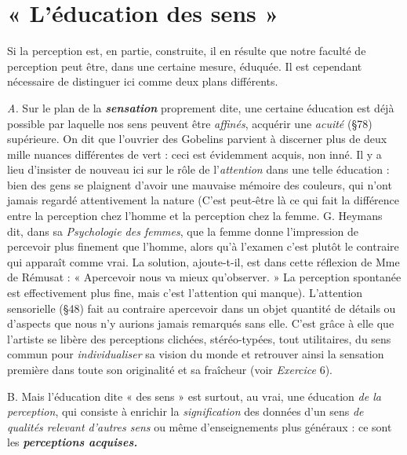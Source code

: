 \section{« L'éducation des sens »}%
Si la perception est, en partie,
construite, il en résulte que notre faculté de perception peut être,
dans une certaine mesure, éduquée. Il est cependant nécessaire de
distinguer ici comme deux plans différents.

{\it A.} Sur le plan de la \textbf{\textit {sensation}} proprement dite, une certaine éducation
est déjà possible par laquelle nos sens peuvent être {\it affinés},
acquérir une {\it acuité} (\S 78) supérieure. On dit que l’ouvrier des Gobelins
parvient à discerner plus de deux mille nuances différentes de vert :
ceci est évidemment acquis, non inné. Il y a lieu d’insister de nouveau
ici sur le rôle de l’{\it attention} dans une telle éducation : bien des gens se
plaignent d’avoir une mauvaise mémoire des couleurs, qui n’ont
jamais regardé attentivement la nature
{\scriptsize (C'est peut-être là ce qui fait la différence entre la perception chez l’homme et la
perception chez la femme. G. Heymans dit, dans sa {\it Psychologie des femmes}, que la
femme donne l'impression de percevoir plus finement que l’homme, alors qu’à l'examen
c'est plutôt le contraire qui apparaît comme vrai. La solution, ajoute-t-il, est dans cette
réflexion de Mme de Rémusat : « Apercevoir nous va mieux qu’observer. » La perception
spontanée est effectivement plus fine, mais c'est l'attention qui manque)}.
L’attention sensorielle
(\S 48) fait au contraire apercevoir dans un objet quantité de détails
ou d’aspects que nous n’y aurions jamais remarqués sans elle. C’est
grâce à elle que l’artiste se libère des perceptions clichées, stéréo-typées,
tout utilitaires, du sens commun pour {\it individualiser} sa vision
du monde et retrouver ainsi la sensation première dans toute son
originalité et sa fraîcheur (voir {\it Exercice} 6).

B. Mais l’éducation dite « des sens » est surtout, au vrai, une éducation
{\it de la perception}, qui consiste à enrichir la {\it signification} des
données d’un sens {\it de qualités relevant d’autres sens} ou même d’enseignements
plus généraux : ce sont les \textbf{\textit {perceptions acquises.}}

